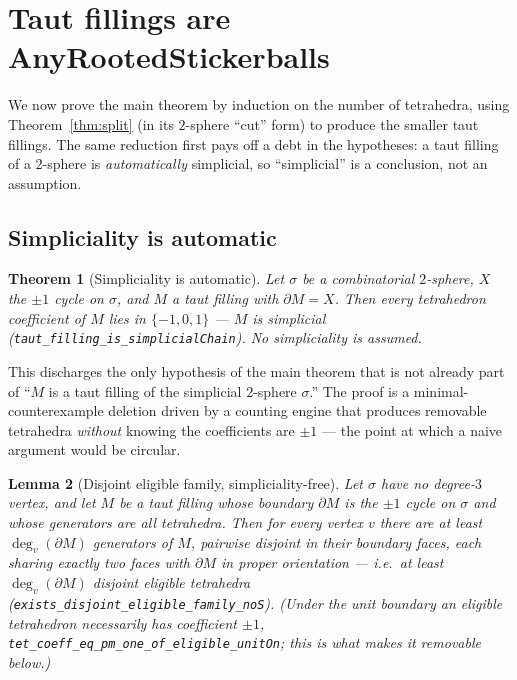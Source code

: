 \documentclass[11pt]{article}
\theoremstyle{plain}
\newtheorem{theorem}{Theorem}[section]
\newtheorem{lemma}[theorem]{Lemma}
\theoremstyle{definition}
\theoremstyle{remark}
\newcommand{\bd}{\partial}
\newcommand{\code}[1]{\texttt{#1}}
\begin{document}
\section{Taut fillings are AnyRootedStickerballs}\label{sec:main}

We now prove the main theorem by induction on the number of tetrahedra, using
Theorem~\ref{thm:split} (in its $2$-sphere ``cut'' form) to produce the smaller taut
fillings. The same reduction first pays off a debt in the hypotheses: a taut filling of a
$2$-sphere is \emph{automatically} simplicial, so ``simplicial'' is a conclusion, not an
assumption.

\subsection*{Simpliciality is automatic}

\begin{theorem}[Simpliciality is automatic]\label{thm:simpl}
Let $\sigma$ be a combinatorial $2$-sphere, $X$ the $\pm1$ cycle on $\sigma$, and $M$ a taut
filling with $\bd M=X$. Then every tetrahedron coefficient of $M$ lies in $\{-1,0,1\}$ --- $M$
is simplicial (\code{taut\_filling\_is\_simplicialChain}). \emph{No simpliciality is assumed.}
\end{theorem}

This discharges the only hypothesis of the main theorem that is not already part of ``$M$ is a
taut filling of the simplicial $2$-sphere $\sigma$.'' The proof is a minimal-counterexample
deletion driven by a counting engine that produces removable tetrahedra \emph{without} knowing
the coefficients are $\pm1$ --- the point at which a naive argument would be circular.

\begin{lemma}[Disjoint eligible family, simpliciality-free]\label{lem:family}
Let $\sigma$ have no degree-$3$ vertex, and let $M$ be a taut filling whose boundary $\bd M$ is
the $\pm1$ cycle on $\sigma$ and whose generators are all tetrahedra. Then for every vertex
$v$ there are at least $\deg_v(\bd M)$ generators of $M$, pairwise disjoint in their boundary
faces, each sharing exactly two faces with $\bd M$ in proper orientation --- i.e.\ at least
$\deg_v(\bd M)$ disjoint \emph{eligible} tetrahedra
(\code{exists\_disjoint\_eligible\_family\_noS}). (Under the unit boundary an eligible
tetrahedron necessarily has coefficient $\pm1$,
\code{tet\_coeff\_eq\_pm\_one\_of\_eligible\_unitOn}; this is what makes it removable below.)
\end{lemma}
\end{document}

